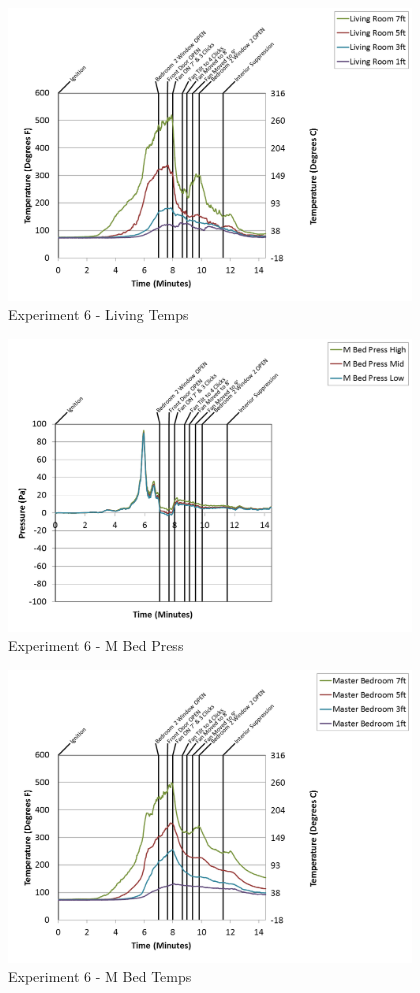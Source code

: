 \documentclass{article}
\begin{document}
\begin{appendices}
\clearpage

\begin{figure}[h!]
	\centering
	\includegraphics[height=3.05in]{0_Images/Results_Charts/Exp_6_Charts/LivingTemps.png}
	\caption{Experiment 6 - Living Temps}
\end{figure}


\begin{figure}[h!]
	\centering
	\includegraphics[height=3.05in]{0_Images/Results_Charts/Exp_6_Charts/MBedPress.png}
	\caption{Experiment 6 - M Bed Press}
\end{figure}

\clearpage

\begin{figure}[h!]
	\centering
	\includegraphics[height=3.05in]{0_Images/Results_Charts/Exp_6_Charts/MBedTemps.png}
	\caption{Experiment 6 - M Bed Temps}
\end{figure}



\end{appendices}
\end{document}
